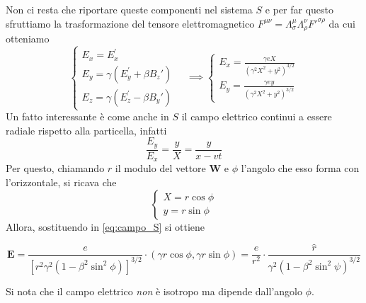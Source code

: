Non ci resta che riportare queste componenti nel sistema $S$ e per far questo sfruttiamo la trasformazione del tensore elettromagnetico $F^{\mu \nu} = \Lambda^{\mu}_{\sigma} \Lambda^{\nu}_{\rho} F'^{\sigma \rho}$ da cui otteniamo
\begin{equation}
\label{eq:campo_S}
\left\{\begin{array} { l } 
{ E _ { x } = E _ { x } ^ { \prime } } \\
{ E _ { y } = \gamma ( E _ { y } ^ { \prime } + \beta B _ { z }' ) } \\
{ E _ { z } = \gamma ( E _ { z } ^ { \prime } - \beta B _ { y }' ) }
\end{array} \quad \implies \left\{\begin{array}{l}
E_x=\frac{\gamma e X}{\left(\gamma^2 X^2+y^2\right)^{3 / 2}} \\
E_y=\frac{\gamma e y}{\left(\gamma^2 X^2+y^2\right)^{3 / 2}}
\end{array}\right.\right.
\end{equation}
Un fatto interessante è come anche in $S$ il campo elettrico continui a essere radiale rispetto alla particella, infatti
\begin{equation}
    \frac{E_y}{E_x} = \frac{y}{X} = \frac{y}{x - vt}
\end{equation}
Per questo, chiamando $r$ il modulo del vettore $\mathbf{W}$ e $\phi$ l'angolo che esso forma con l'orizzontale, si ricava che 
\begin{equation*}
\left\{\begin{array} { l } 
{X = r\cos\phi} \\
{y = r\sin\phi}
\end{array}\right.
\end{equation*}
Allora, sostituendo in \eqref{eq:campo_S} si ottiene
\begin{tcolorbox}[colback=black!5!white, colframe=black!45!white, boxrule=0.8pt] 
\begin{equation}
    \mathbf{E}=\frac{e}{\left[r^2 \gamma^2\left(1-\beta^2 \sin ^2 \phi\right)\right]^{3 / 2}} \cdot\left(\gamma r \cos \phi, \gamma r \sin \phi\right) =\frac{e}{r^2} \cdot \frac{\hat{r}}{\gamma^2\left(1-\beta^2 \sin^2 \psi\right)^{3 / 2}}
\end{equation}
\end{tcolorbox}
Si nota che il campo elettrico \emph{non} è isotropo ma dipende dall'angolo $\phi$. 

